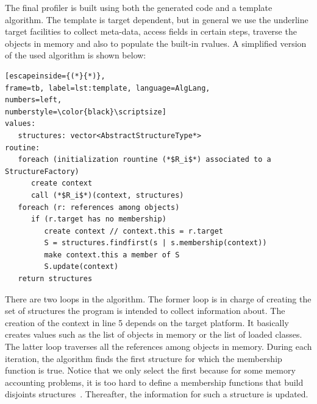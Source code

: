 The final profiler is built using both the generated code and a template algorithm.
The template is target dependent, but in general we use the underline target facilities to collect meta-data, access fields in certain steps, traverse the objects in memory and also to populate the built-in rvalues.
A simplified version of the used algorithm is shown below:
\begin{lstlisting}[escapeinside={(*}{*)},
frame=tb, label=lst:template, language=AlgLang,
numbers=left,
numberstyle=\color{black}\scriptsize]
values:
   structures: vector<AbstractStructureType*>
routine:
   foreach (initialization rountine (*$R_i$*) associated to a StructureFactory)
      create context
	  call (*$R_i$*)(context, structures)
   foreach (r: references among objects)
      if (r.target has no membership)
         create context // context.this = r.target
         S = structures.findfirst(s | s.membership(context))
         make context.this a member of S
         S.update(context)
   return structures 
\end{lstlisting}
There are two loops in the algorithm. 
The former loop is in charge of creating the set of structures the program is intended to collect information about.
The creation of the context in line 5 depends on the target platform.
It basically creates values such as the list of objects in memory or the list of loaded classes.
The latter loop traverses all the references among objects in memory.
During each iteration, the algorithm finds the first structure for which the membership function is true.
Notice that we only select the first because for some memory accounting problems, it is too hard to define a membership functions that build disjoints structures~\cite{dsn/09/geoffray/ijvm,Attouchi:2014:MMM:2602458.2602467}.
Thereafter, the information for such a structure is updated.


